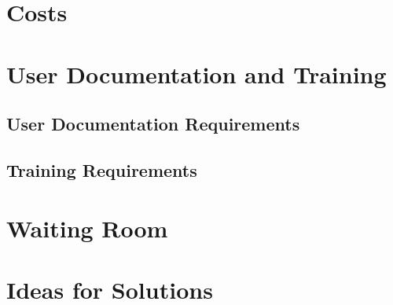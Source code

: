 \documentclass{scrreprt}
\begin{document}
\section{Costs}

\section{User Documentation and Training}

\subsection{User Documentation Requirements}

\subsection{Training Requirements}

\section{Waiting Room}

\section{Ideas for Solutions}


 
\end{document}
